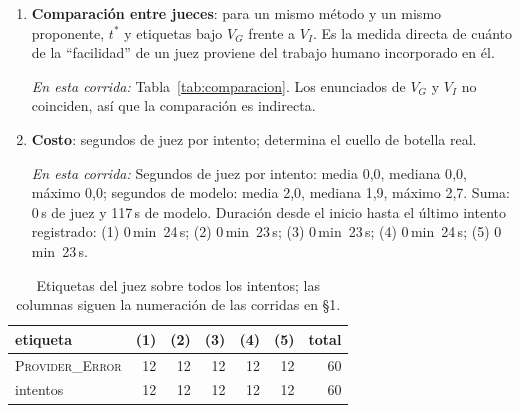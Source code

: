 \documentclass[11pt,a4paper]{article}
\begin{document}
\begin{enumerate}
  \item \textbf{Comparación entre jueces}: para un mismo método y un mismo proponente, $t^*$ y etiquetas bajo $V_G$ frente a $V_I$. Es la medida directa de cuánto de la ``facilidad'' de un juez proviene del trabajo humano incorporado en él.

  \emph{En esta corrida:} Tabla~\ref{tab:comparacion}. Los enunciados de $V_G$ y $V_I$ no coinciden, así que la comparación es indirecta.

  \item \textbf{Costo}: segundos de juez por intento; determina el cuello de botella real.

  \emph{En esta corrida:} Segundos de juez por intento: media 0{,}0, mediana 0{,}0, máximo 0{,}0; segundos de modelo: media 2{,}0, mediana 1{,}9, máximo 2{,}7. Suma: 0\,s de juez y 117\,s de modelo. Duración desde el inicio hasta el último intento registrado: (1) 0\,min~24\,s; (2) 0\,min~23\,s; (3) 0\,min~23\,s; (4) 0\,min~24\,s; (5) 0\,min~23\,s.

\end{enumerate}

\begin{table}[!ht]
\centering
\footnotesize
\begin{tabular}{@{}lrrrrrr@{}}
\toprule
etiqueta & (1) & (2) & (3) & (4) & (5) & total \\
\midrule
\textsc{Provider\_Error} & 12 & 12 & 12 & 12 & 12 & 60 \\
intentos & 12 & 12 & 12 & 12 & 12 & 60 \\
\bottomrule
\end{tabular}
\caption{Etiquetas del juez sobre todos los intentos; las columnas siguen la numeración de las corridas en §1.}
\label{tab:etiquetas}
\end{table}
\end{document}
